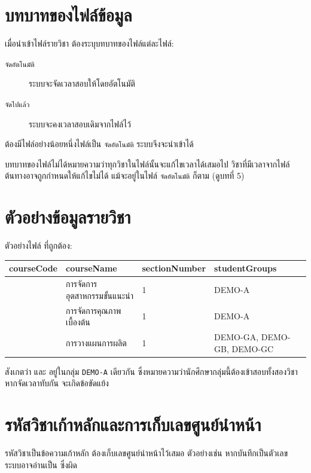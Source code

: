 \section{บทบาทของไฟล์ข้อมูล}

เมื่อนำเข้าไฟล์รายวิชา ต้องระบุบทบาทของไฟล์แต่ละไฟล์:

\begin{description}
  \item[\texttt{จัดอัตโนมัติ}] ระบบจะจัดเวลาสอบให้โดยอัตโนมัติ
  \item[\texttt{จัดไปแล้ว}] ระบบจะคงเวลาสอบเดิมจากไฟล์ไว้
\end{description}

ต้องมีไฟล์อย่างน้อยหนึ่งไฟล์เป็น \texttt{จัดอัตโนมัติ} ระบบจึงจะนำเข้าได้

\begin{caution}
บทบาทของไฟล์ไม่ได้หมายความว่าทุกวิชาในไฟล์นั้นจะแก้ไขเวลาได้เสมอไป
วิชาที่มีเวลาจากไฟล์ต้นทางอาจถูกกำหนดให้แก้ไขไม่ได้
แม้จะอยู่ในไฟล์ \texttt{จัดอัตโนมัติ} ก็ตาม (ดูบทที่ 5)
\end{caution}

\section{ตัวอย่างข้อมูลรายวิชา}

ตัวอย่างไฟล์  ที่ถูกต้อง:

\begin{longtable}{L{2.9cm}L{3.9cm}L{3.1cm}L{3.9cm}}
\toprule
\textbf{courseCode} & \textbf{courseName} & \textbf{sectionNumber} & \textbf{studentGroups} \\
\midrule
{} & การจัดการอุตสาหกรรมขั้นแนะนำ & 1 & DEMO-A \\
 & การจัดการคุณภาพเบื้องต้น & 1 & DEMO-A \\
 & การวางแผนการผลิต & 1 & DEMO-GA, DEMO-GB, DEMO-GC \\
\bottomrule
\end{longtable}

สังเกตว่า  และ  อยู่ในกลุ่ม \texttt{DEMO-A}
เดียวกัน ซึ่งหมายความว่านักศึกษากลุ่มนี้ต้องเข้าสอบทั้งสองวิชา หากจัดเวลาทับกัน
จะเกิดข้อขัดแย้ง

\section{รหัสวิชาเก้าหลักและการเก็บเลขศูนย์นำหน้า}

รหัสวิชาเป็นข้อความเก้าหลัก ต้องเก็บเลขศูนย์นำหน้าไว้เสมอ ตัวอย่างเช่น
 หากบันทึกเป็นตัวเลข ระบบอาจอ่านเป็น 
ซึ่งผิด

